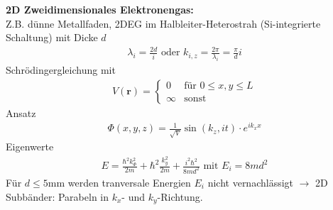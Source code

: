 \begin{itemize}
    \textbf{2D Zweidimensionales Elektronengas:} \\
        Z.B. dünne Metallfaden, 2DEG im Halbleiter-Heterostrah (Si-integrierte Schaltung) mit Dicke $d$
    \begin{align*}
        \lambda_i = \frac{2d}{i} \text{ oder } k_{i,z} = \frac{2\pi}{\lambda_i} = \frac{\pi}{d}i
    \end{align*}
    Schrödingergleichung mit
    \begin{align*}
        V(\textbf{r}) = \begin{cases}
                0 &\text{für } 0 \leq x,y \leq L\\
                \infty & \text{sonst}
            \end{cases}
    \end{align*}
    Ansatz 
    \begin{align*}
        \Phi(x,y,z) = \frac{1}{\sqrt{V}}\sin(k_z,it)\cdot e^{i k_x x}
    \end{align*}
    Eigenwerte
    \begin{align*}
        E = \frac{\hbar^2 k_{\Phi}^2}{2m} + \hbar^2 \frac{k_y^2}{2m} + \frac{i^2\hbar^2}{8md^2} \text{ mit } E_i = 8md^2
    \end{align*}
    Für $d\leq 5$mm werden tranversale Energien $E_i$ nicht vernachlässigt $\rightarrow$ 2D Subbänder: Parabeln in $k_x$- und $k_y$-Richtung.
    

\end{itemize}
